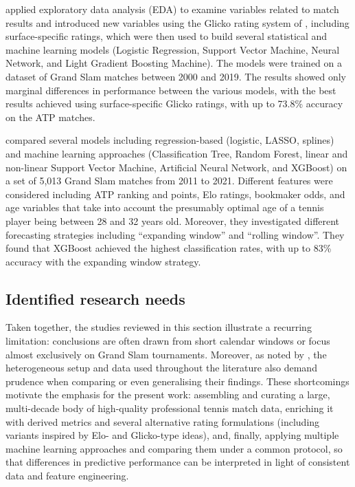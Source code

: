 \textcite{yue_2022} applied exploratory data analysis (EDA) to examine variables related to match
results and introduced new variables using the Glicko rating system of \textcite{glickman_1999},
including surface-specific ratings, which were then used to build several statistical and machine
learning models (Logistic Regression, Support Vector Machine, Neural Network, and Light Gradient
Boosting Machine). The models were trained on a dataset of Grand Slam matches between 2000 and 2019.
The results showed only marginal differences in performance between the various models, with the
best results achieved using surface-specific Glicko ratings, with up to 73.8\% accuracy on the ATP
matches.

\textcite{buhamra_2025-2} compared several models including regression-based (logistic, LASSO,
splines) and machine learning approaches (Classification Tree, Random Forest, linear and non-linear
Support Vector Machine, Artificial Neural Network, and XGBoost) on a set of 5{,}013 Grand Slam
matches from 2011 to 2021. Different features were considered including ATP ranking and points,
Elo ratings, bookmaker odds, and age variables that take into account the presumably optimal age of
a tennis player being between 28 and 32 years old. Moreover, they investigated different forecasting
strategies including ``expanding window'' and ``rolling window''. They found that XGBoost achieved
the highest classification rates, with up to 83\% accuracy with the expanding window strategy.

\subsection{Identified research needs}

Taken together, the studies reviewed in this section illustrate a recurring limitation: conclusions
are often drawn from short calendar windows or focus almost exclusively on Grand Slam tournaments.
Moreover, as noted by \textcite{wilkens_2021}, the heterogeneous setup and data used throughout the
literature also demand prudence when comparing or even generalising their findings. These
shortcomings motivate the emphasis for the present work: assembling and curating a large,
multi-decade body of high-quality professional tennis match data, enriching it with derived metrics
and several alternative rating formulations (including variants inspired by Elo- and Glicko-type
ideas), and, finally, applying multiple machine learning approaches and comparing them under a
common protocol, so that differences in predictive performance can be interpreted in light of
consistent data and feature engineering.


